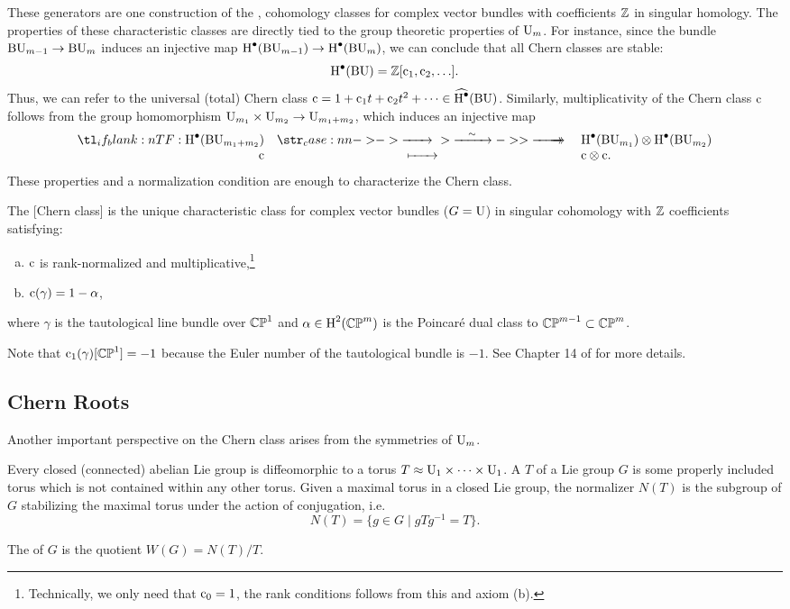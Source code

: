 These generators are one construction of the , cohomology classes for complex vector bundles with coefficients $\mathbb{Z}$ in singular homology. The properties of these characteristic classes are directly tied to the group theoretic properties of $\mathrm{U}_m$.
For instance, since the bundle $\mathrm{BU}_{m-1} \to \mathrm{BU}_{m}$ induces an injective map $\operatorname{H}^\bullet(\mathrm{BU}_{m-1}) \to \operatorname{H}^\bullet(\mathrm{BU}_m)$, we can conclude that all Chern classes are stable:
\[
	\operatorname{H}^\bullet(\mathrm{BU}) = \mathbb{Z}[\mathrm{c}_1,\mathrm{c}_2,\ldots].
\]
Thus, we can refer to the universal (total) Chern class $\mathrm{c}=1+\mathrm{c}_1t+\mathrm{c}_2t^2+\cdots\in \widehat{\operatorname{H}^\bullet}(\mathrm{BU})$.
Similarly, multiplicativity of the Chern class $\mathrm{c}$ follows from the group homomorphism $\mathrm{U}_{m_1}\times \mathrm{U}_{m_2} \to \mathrm{U}_{m_1+m_2}$, which induces an injective map 
\[
	\lkxfunc{}{\H^\bullet(\BU_{m_1+m_2})}{\H^\bullet(\BU_{m_1})\otimes \H^\bullet(\BU_{m_2})}{\cl}{\cl \otimes \cl.}
\]
These properties and a normalization condition are enough to characterize the Chern class.
\begin{proposition}
	The [Chern class] is the unique characteristic class for complex vector bundles ($G=\mathrm{U}$) in singular cohomology with $\mathbb{Z}$ coefficients satisfying:
	\begin{enumerate}[(a)]
		\item $\mathrm{c}$ is rank-normalized and multiplicative,\footnote{Technically, we only need that $\mathrm{c}_0=1$, the rank conditions follows from this and axiom (b).}
		\item $\mathrm{c}(\gamma)=1-\alpha$,
	\end{enumerate}
	where $\gamma$ is the tautological line bundle over $\mathbb{CP}^1$ and $\alpha\in \operatorname{H}^2(\mathbb{CP}^m)$ is the Poincar\'e dual class to $\mathbb{CP}^{m-1}\subset \mathbb{CP}^m$.
\end{proposition}

Note that $\mathrm{c}_1(\gamma)[\mathbb{CP}^1]=-1$ because the Euler number of the tautological bundle is $-1$. See Chapter 14 of \cite{milnorstasheff1974} for more details.

\subsection{Chern Roots}

Another important perspective on the Chern class arises from the symmetries of $\mathrm{U}_m$. 

Every closed (connected) abelian Lie group is diffeomorphic to a torus $T \approx \mathrm{U}_1\times \cdots\times \mathrm{U}_1$. A  $T$ of a Lie group $G$ is some properly included torus which is not contained within any other torus. Given a maximal torus in a closed Lie group, the normalizer $N(T)$ is the subgroup of $G$ stabilizing the maximal torus under the action of conjugation, i.e. 
\[
	N(T) = \{ g \in G \mid gTg^{-1} = T\}.
\]
\begin{definition}
	The  of $G$ is the quotient $W(G)=N(T)/T$.
\end{definition}

